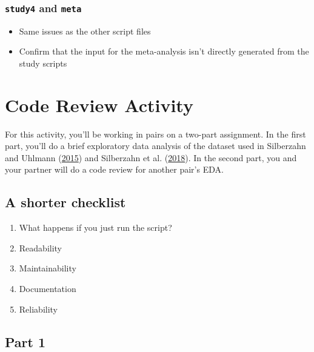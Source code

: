 \documentclass[
]{article}
\providecommand{\tightlist}{%
  \setlength{\itemsep}{0pt}\setlength{\parskip}{0pt}}
\begin{document}
\hypertarget{study4-and-meta}{%
\subsubsection{\texorpdfstring{\texttt{study4} and \texttt{meta}}{study4 and meta}}\label{study4-and-meta}}

\begin{itemize}
\tightlist
\item
  Same issues as the other script files
\item
  Confirm that the input for the meta-analysis isn't directly generated from the study scripts
\end{itemize}

\hypertarget{code-review-activity}{%
\section{Code Review Activity}\label{code-review-activity}}

For this activity, you'll be working in pairs on a two-part assignment. In the first part, you'll do a brief exploratory data analysis of the dataset used in
Silberzahn and Uhlmann (\protect\hyperlink{ref-SilberzahnCrowdsourcedResearchMany2015}{2015}) and Silberzahn et al. (\protect\hyperlink{ref-SilberzahnManyAnalystsOne2018}{2018}). In the second part, you and your partner will do a code review for another pair's EDA.

\hypertarget{a-shorter-checklist}{%
\subsection{A shorter checklist}\label{a-shorter-checklist}}

\begin{enumerate}
\def\labelenumi{\arabic{enumi}.}
\setcounter{enumi}{-1}
\tightlist
\item
  What happens if you just run the script?
\item
  Readability
\item
  Maintainability
\item
  Documentation
\item
  Reliability
\end{enumerate}

\hypertarget{part-1}{%
\subsection{Part 1}\label{part-1}}
\end{document}
